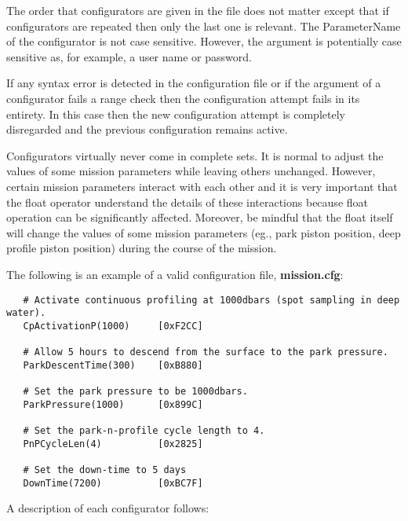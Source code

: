 The order that configurators are given in the file does not matter except
that if configurators are repeated then only the last one is relevant.  The
ParameterName of the configurator is not case sensitive.  However, the
argument is potentially case sensitive as, for example, a user name or
password.  

If any syntax error is detected in the configuration file or if the argument
of a configurator fails a range check then the configuration attempt fails
in its entirety.  In this case then the new configuration attempt is
completely disregarded and the previous configuration remains active.

Configurators virtually never come in complete sets.  It is normal to adjust
the values of some mission parameters while leaving others unchanged.
However, certain mission parameters interact with each other and it is very
important that the float operator understand the details of these
interactions because float operation can be significantly affected.
Moreover, be mindful that the float itself will change the values of some
mission parameters (eg., park piston position, deep profile piston position)
during the course of the mission.

\begin{minipage}{6in}
The following is an example of a valid configuration file, \textbf{mission.cfg}:
\begin{verbatim}
   # Activate continuous profiling at 1000dbars (spot sampling in deep water).
   CpActivationP(1000)     [0xF2CC]
   
   # Allow 5 hours to descend from the surface to the park pressure.
   ParkDescentTime(300)    [0xB880]
   
   # Set the park pressure to be 1000dbars.
   ParkPressure(1000)      [0x899C]
   
   # Set the park-n-profile cycle length to 4.
   PnPCycleLen(4)          [0x2825]
   
   # Set the down-time to 5 days
   DownTime(7200)          [0xBC7F]

\end{verbatim}
\end{minipage}

A description of each configurator follows:

